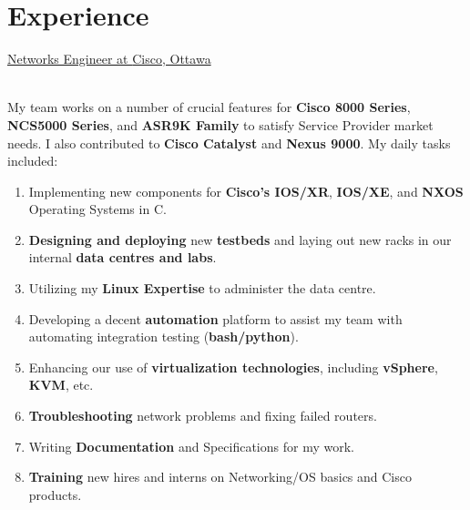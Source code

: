 \documentclass[letterpaper]{twentysecondcv} %
\begin{document}

\section{Experience}

\begin{twenty}

           {\underline{Networks Engineer at \textcolor{OliveGreen}{Cisco}, Ottawa}}
           {}
           {\\
            My team works on a number of crucial features for \textbf{Cisco 8000 Series},
            \textbf{NCS5000 Series}, and \textbf{ASR9K Family} to satisfy Service Provider
            market needs. I also contributed to \textbf{Cisco Catalyst} and \textbf{Nexus 9000}.
            My daily tasks included:
            \\
            \begin{enumerate}
               \item{Implementing new components for \textbf{Cisco's IOS/XR}, \textbf{IOS/XE}, and \textbf{NXOS} Operating Systems in C.}
               \item{\textbf{Designing and deploying} new \textbf{testbeds} and laying out new racks in our internal \textbf{data centres and labs}.}
               \item{Utilizing my \textbf{Linux Expertise} to administer the data centre.}
               \item{Developing a decent \textbf{automation} platform to assist my team with automating integration testing (\textbf{bash/python}).}
               \item{Enhancing our use of \textbf{virtualization technologies}, including \textbf{vSphere}, \textbf{KVM}, etc.}
               \item{\textbf{Troubleshooting} network problems and fixing failed routers.}
               \item{Writing \textbf{Documentation} and Specifications for my work.}
               \item{\textbf{Training} new hires and interns on Networking/OS basics and Cisco products.}
            \end{enumerate}
           }


\end{twenty}
\end{document}
